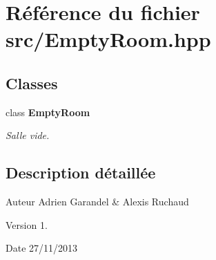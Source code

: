 \section{Référence du fichier src/\-Empty\-Room.hpp}
\label{_empty_room_8hpp}
\subsection*{Classes}
\begin{DoxyCompactItemize}
\item 
class {\bf Empty\-Room}
\begin{DoxyCompactList}\small\item\em Salle vide. \end{DoxyCompactList}\end{DoxyCompactItemize}


\subsection{Description détaillée}
\begin{DoxyAuthor}{Auteur}
Adrien Garandel \& Alexis Ruchaud 
\end{DoxyAuthor}
\begin{DoxyVersion}{Version}
1. 
\end{DoxyVersion}
\begin{DoxyDate}{Date}
27/11/2013 
\end{DoxyDate}
